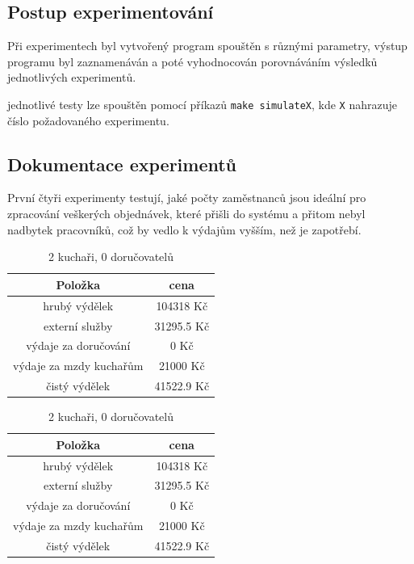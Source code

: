 \documentclass[a4paper, 11pt]{article}
\begin{document}
\subsection{Postup experimentování}
Při experimentech byl vytvořený program spouštěn s různými parametry, výstup programu byl zaznamenáván a poté vyhodnocován porovnáváním výsledků jednotlivých experimentů.


jednotlivé testy lze spouštěn pomocí příkazů \texttt{make simulateX}, kde \texttt{X} nahrazuje číslo požadovaného experimentu.

\subsection{Dokumentace experimentů}
První čtyři experimenty testují, jaké počty zaměstnanců jsou ideální pro zpracování veškerých objednávek, které přišli do systému a přitom nebyl nadbytek pracovníků, což by vedlo k výdajům vyšším, než je zapotřebí.

\begin{table}[h]
\centering
\begin{tabular}{cc}
\textbf{Položka} & \textbf{cena}                                                                                   \\ \hline
hrubý výdělek & 104318 Kč \\ \hline
externí služby  & 31295.5 Kč \\ \hline                      
výdaje za doručování &  0 Kč \\ \hline
výdaje za mzdy kuchařům &  21000 Kč \\ \hline
čistý výdělek &  41522.9 Kč
\end{tabular}
\caption{2 kuchaři, 0 doručovatelů}
\end{table}

\begin{table}[h]
\centering
\begin{tabular}{cc}
\textbf{Položka} & \textbf{cena}                                                                                   \\ \hline
hrubý výdělek & 104318 Kč \\ \hline
externí služby  & 31295.5 Kč \\ \hline                      
výdaje za doručování &  0 Kč \\ \hline
výdaje za mzdy kuchařům &  21000 Kč \\ \hline
čistý výdělek &  41522.9 Kč
\end{tabular}
\caption{2 kuchaři, 0 doručovatelů}
\end{table}
\end{document}
